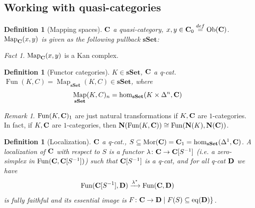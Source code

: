 \documentclass[A4paper, british, reqno]{amsart}
\theoremstyle{darkgreentheorem}
\theoremstyle{darkbluedefinition}
\newtheorem{defn}[thm]{Definition}
\theoremstyle{darkredexample}
\theoremstyle{remark}
\newtheorem{rem}[thm]{Remark}
\newtheorem{fact}[thm]{Fact}
\DeclareMathOperator{\Fun}{Fun}
\DeclareMathOperator{\Ob}{Ob}
\DeclareMathOperator{\Map}{Map}
\newcommand{\sSet}{\mathbf{sSet}}
\newcommand{\1}{\mathbbm{1}}
\newcommand{\sub}{\subseteq}
\begin{document}
\subsection{Working with quasi-categories}

\begin{defn}[Mapping spaces]
    $\mathbf{C}$ a quasi-category, $x,y\in \bfC_{0}\overset{def}{=}\Ob(\bfC)$.
    $\Map_{\bfC}(x,y)$ is given as the following pullback $\sSet$:
    \begin{center}
    \end{center}
\end{defn}

\begin{fact}
    $\Map_{\bfC}(x,y)$ is a Kan complex.
\end{fact}

\begin{defn}[Functor categories]
    $K\in \sSet$, $\mathbf{C}$ a q-cat.
    $\Fun(K,C)=\Map_{\sSet}(K,C)\in \sSet$, where
    \[ \Map_{\sSet}(K,C)_{n}=\operatorname{hom}_{\sSet}(K\times \Delta^{n},\bfC) \]
\end{defn}

\begin{rem}
    $\Fun(K,\bfC)_{1}$ are just natural transformations if $K,\mathbf{C}$ are $1$-categories.
    In fact, if $K,\mathbf{C}$ are $1$-categories, then $\bfN(\Fun(K,\bfC))\cong \Fun(\bfN(K),\bfN(\bfC))$.
\end{rem}

\begin{defn}[Localization]
    $\mathbf{C}$ a q-cat., $S\subseteq \operatorname{Mor}(\bfC)=\bfC_{1}=\operatorname{hom}_{\sSet}(\Delta^{1},\bfC)$.
    A \textit{localization} of $\mathbf{C}$ with respect to $S$ is a functor $\lambda\colon \mathbf{C}\to \mathbf{C}[S^{-1}]$ (i.e. a zero-simplex in $\Fun(\bfC,\bfC[S^{-1}])$) such that $\mathbf{C}[S^{-1}]$ is a q-cat, and for all q-cat $\mathbf{D}$ we have
    \[ \Fun(\bfC[S^{-1}],\D)\xrightarrow{\lambda^{*}} \Fun(\bfC,\D) \]
    is fully faithful and its essential image is $F\colon \bfC\to \D \mid F(S)\sub \operatorname{eq}(\D)\}$.
\end{defn}
\end{document}
